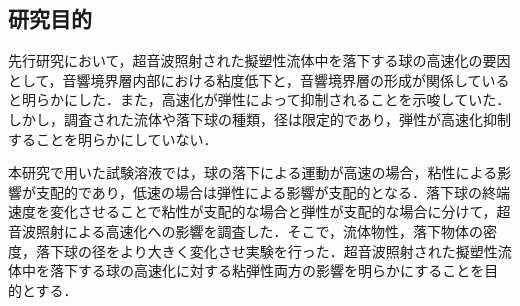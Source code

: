 \subsection{研究目的}

先行研究\cite{ref:8}において，超音波照射された擬塑性流体中を落下する球の高速化の要因として，音響境界層内部における粘度低下と，音響境界層の形成が関係していると明らかにした．また，高速化が弾性によって抑制されることを示唆していた．しかし，調査された流体や落下球の種類，径は限定的であり，弾性が高速化抑制することを明らかにしていない．

本研究で用いた試験溶液では，球の落下による運動が高速の場合，粘性による影響が支配的であり，低速の場合は弾性による影響が支配的となる．落下球の終端速度を変化させることで粘性が支配的な場合と弾性が支配的な場合に分けて，超音波照射による高速化への影響を調査した．そこで，流体物性，落下物体の密度，落下球の径をより大きく変化させ実験を行った．超音波照射された擬塑性流体中を落下する球の高速化に対する粘弾性両方の影響を明らかにすることを目的とする．
